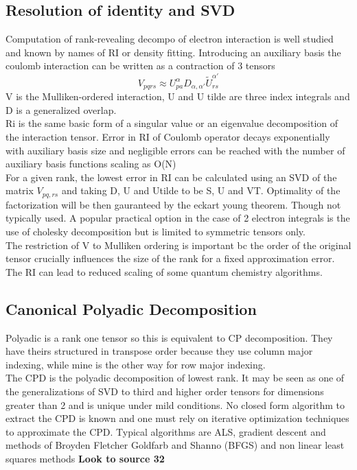 \documentclass[10pt, draft]{article}
\begin{document}
\subsection{Resolution of identity and SVD}
Computation of rank-revealing decompo of electron interaction is well studied and known by names of RI or density fitting.  Introducing an auxiliary basis the coulomb interaction can be written as a contraction of 3 tensors 
\[V_{pqrs} \approx U_{pa}^\alpha D_{\alpha, \alpha'} \tilde{U}_{rs}^{\alpha'}\]
V is the Mulliken-ordered interaction, U and U tilde are three index integrals and D is a generalized overlap.  \\
Ri is the same basic form of a singular value or an eigenvalue decomposition of the interaction tensor.  Error in RI of Coulomb operator decays exponentially with auxiliary basis size and negligible errors can be reached with the number of auxiliary basis functions scaling as O(N)\\
For a given rank, the lowest error in RI can be calculated using an SVD of the matrix $V_{pq, rs}$ and taking D, U and Utilde to be S, U and VT. Optimality of the factorization will be then gauranteed by the eckart young theorem. Though not typically used.  A popular practical option in the case of 2 electron integrals is the use of cholesky decomposition but is limited to symmetric tensors only.\\
The restriction of V to Mulliken ordering is important bc the order of the original tensor crucially influences the size of the rank for a fixed approximation error.  \\
The RI can lead to reduced scaling of some quantum chemistry algorithms.  

\subsection{Canonical Polyadic Decomposition}
Polyadic is a rank one tensor so this is equivalent to CP decomposition.  They have theirs structured in transpose order because they use column major indexing, while mine is the other way for row major indexing.\\
The CPD is the polyadic decomposition of lowest rank.  It may be seen as one of the generalizations of SVD to third and higher order tensors for dimensions greater than 2 and is unique under mild conditions. No closed form algorithm to extract the CPD is known and one must rely on iterative optimization techniques to approximate the CPD.  Typical algorithms are ALS, gradient descent and methods of Broyden Fletcher Goldfarb and Shanno (BFGS) and non linear least squares methods \textbf{Look to source 32}\\
\end{document}
